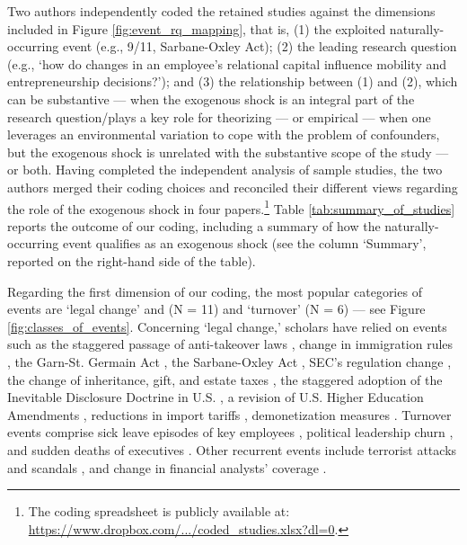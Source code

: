 \begin{refsection}
Two authors independently coded the retained studies against the dimensions 
included in Figure \ref{fig:event_rq_mapping}, that is, (1) the exploited 
naturally-occurring event (e.g., 9/11, Sarbane-Oxley Act); (2) the leading
research question (e.g., `how do changes in an employee's relational capital
influence mobility and entrepreneurship decisions?'); and (3) the relationship
between (1) and (2), which can be substantive --- when the exogenous shock is an
integral part of the research question/plays a key role for theorizing 
--- or empirical --- when one leverages an environmental variation to cope
with the problem of confounders, but the exogenous shock is unrelated with the
substantive scope of the study --- or both. Having completed the independent 
analysis of sample studies, the two authors merged their coding choices and 
reconciled their different views regarding the role of the exogenous shock 
in four papers.\footnote{The coding spreadsheet is publicly available at: \href{
  https://www.dropbox.com/s/yl0sf9p9tq253fy/coded_studies.csv?dl=0}
{https://www.dropbox.com/.../coded\_studies.xlsx?dl=0}.} 
Table \ref{tab:summary_of_studies} reports the outcome of our coding, including
a summary of how the naturally-occurring event qualifies as an exogenous
shock (see the column `Summary', reported on the right-hand side of the table).

Regarding the first dimension of our coding, the most popular categories of 
events are `legal change' and (N = 11) and `turnover' (N = 6) --- see Figure 
\ref{fig:classes_of_events}. Concerning `legal change,' scholars have relied on
events such as the staggered passage of anti-takeover laws 
\autocite{cabral202128,wang20162393}, change in immigration rules 
\autocite{choudhury2019203}, the Garn-St. Germain Act
\autocite{haveman2001253}, the Sarbane-Oxley Act \autocite{gupta2020802},
SEC's regulation change \autocite{jia2020290}, the change of inheritance, gift,
and estate taxes \autocite{kang20201300}, the staggered adoption of the
Inevitable Disclosure Doctrine in U.S. \autocite{kang20201300}, a revision of
U.S. Higher Education Amendments \autocite{krishnan20194522}, reductions in
import tariffs \autocite{li20194011}, demonetization measures
\autocite{natarajan20191070}.  Turnover events comprise sick leave episodes of
key employees \autocite{chen20181239,drexler20142722,chown2015177,}, political
leadership churn \autocite{birhanu2020,byun20191368}, and sudden deaths
of executives \autocite{ke2019439}. Other recurrent events include terrorist
attacks \autocite{corbo2016323,vergne20121027,li20194011} and scandals
\autocite{cai2019159,hilary2021}, and change in financial analysts' coverage
\autocite{chatterji2010917,qian20192271}.


\end{refsection}

